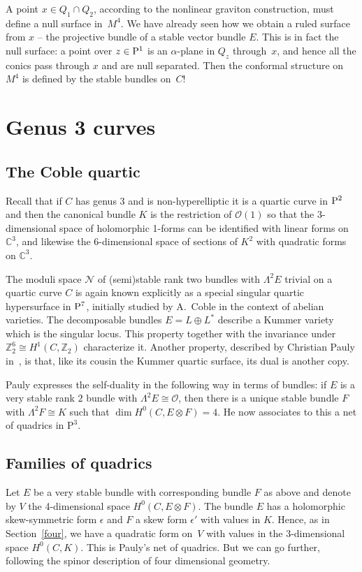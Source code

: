 \documentclass[10pt,a4paper]{amsart}
\numberwithin{equation}{section}
\begin{document}
A point $x\in Q_1\cap Q_2$, according to the nonlinear graviton construction, must define a null surface in~$M^4$. We have already seen how we obtain a ruled surface from $x$ -- the projective bundle of a stable vector bundle $E$. This is in fact the null surface: a point over $z\in {\rm P}^1$ is an $\alpha$-plane in $Q_z$ through~$x$, and hence all the conics pass through $x$ and are null separated. Then the conformal structure on $M^4$ is defined by the stable bundles on~$C$!

\section{Genus 3 curves}
\subsection{The Coble quartic}

Recall that if $C$ has genus $3$ and is non-hyperelliptic it is a quartic curve in ${\rm P}^2$ and then the canonical bundle $K$ is the restriction of $\mathcal{O}(1)$ so that the 3-dimensional space of holomorphic 1-forms can be identified with linear forms on ${\mathbb C}^3$, and likewise the 6-dimensional space of sections of $K^2$ with quadratic forms on ${\mathbb C}^3$.

The moduli space ${\mathcal N}$ of (semi)stable rank two bundles with $\Lambda^2E$ trivial on a quartic curve $C$ is again known explicitly \cite{Narasimhan/Ramanan1987} as a special singular quartic hypersurface in ${\rm P}^7$, initially studied by A.~Coble in the context of abelian varieties. The decomposable bundles $E=L\oplus L^*$ describe a Kummer variety which is the singular locus. This property together with the invariance under ${\mathbb Z}_2^6\cong H^1(C,{\mathbb Z}_2)$ characterize it. Another property, described by Christian Pauly in~\cite{Pauly}, is that, like its cousin the Kummer quartic surface, its dual is another copy.

Pauly expresses the self-duality in the following way in terms of bundles: if $E$ is a very stable rank $2$ bundle with $\Lambda^2E\cong \mathcal{O}$, then there is a unique stable bundle $F$ with $\Lambda^2F\cong K$ such that $\dim H^0(C, E\otimes F)=4$. He now associates to this a net of quadrics in $\mathrm{P}^3$.

\subsection{Families of quadrics}\label{sd}
Let $E$ be a very stable bundle with corresponding bundle $F$ as above and denote by $V$ the 4-dimensional space $H^0(C, E\otimes F)$. The bundle $E$ has a holomorphic skew-symmetric form $\epsilon$ and $F$ a skew form $\epsilon'$ with values in $K$. Hence, as in Section~\ref{four}, we have a quadratic form on~$V$ with values in the 3-dimensional space $H^0(C,K)$. This is Pauly's net of quadrics. But we can go further, following the spinor description of four dimensional geometry.
\end{document}
